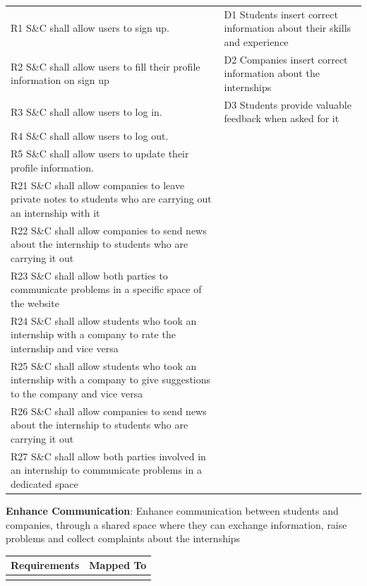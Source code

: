 \begin{enumerate}[label={[G\arabic*]}]
\begin{longtable}{|p{8cm}|p{8cm}|}
\hline
\endfoot

\hline
\endlastfoot
R1 S\&C shall allow users to sign up. & D1 Students insert correct information about their skills and experience \\
R2 S\&C shall allow users to fill their profile information on sign up & D2 Companies insert correct information about the internships \\
R3 S\&C shall allow users to log in. & D3 Students provide valuable feedback when asked for it \\
R4 S\&C shall allow users to log out. & \\
R5 S\&C shall allow users to update their profile information. & \\
R21 S\&C shall allow companies to leave private notes to students who are carrying out an internship with it & \\
R22 S\&C shall allow companies to send news about the internship to students who are carrying it out & \\
R23 S\&C shall allow both parties to communicate problems in a specific space of the website & \\
R24 S\&C shall allow students who took an internship with a company to rate the internship and vice versa & \\
R25 S\&C shall allow students who took an internship with a company to give suggestions to the company and vice versa & \\
R26 S\&C shall allow companies to send news about the internship to students who are carrying it out & \\
R27 S\&C shall allow both parties involved in an internship to communicate problems in a dedicated space & \\

\end{longtable}
\newpage
\item \textbf{Enhance Communication}: 
                Enhance communication between students and companies, through a shared space where they can exchange information, raise problems and collect complaints about the internships

\begin{longtable}{|p{8cm}|p{8cm}|}
\hline
\rowcolor[HTML]{CFE2F3} 
\textbf{Requirements} & \textbf{Mapped To} \\
\hline
\endfirsthead

\hline
\endfoot


\end{longtable}
\end{enumerate}
